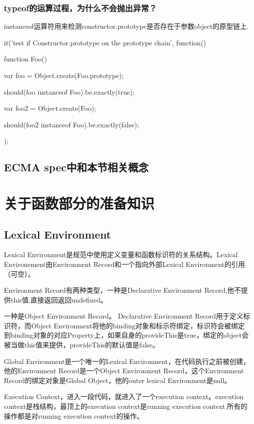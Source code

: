 \subsubsection{typeof的运算过程，为什么不会抛出异常？}

instanceof运算符用来检测constructor.prototype是否存在于参数object的原型链上.
\begin{JavaScript}
		it('test if Constructor.prototype on the prototype chain', function(){
			function Foo(){}

			var foo = Object.create(Foo.prototype);

			should(foo instanceof Foo).be.exactly(true);

			var foo2 = Object.create(Foo);

			should(foo2 instanceof Foo).be.exactly(false);
		});
\end{JavaScript}
	
\subsection{ECMA spec中和本节相关概念}

\section{关于函数部分的准备知识}

\subsection{Lexical Environment}

Lexical Environment是规范中使用定义变量和函数标识符的关系结构。Lexical Environement由Environment Record和一个指向外部Lexical Environment的引用（可空）。

Environment Record有两种类型，一种是Declarative Environment Record,他不提供this值,直接返回返回undefined。

一种是Object Environment Record。 Declarative Environment Record用于定义标识符，而Object Environment将他的binding对象和标示符绑定，标识符会被绑定到binding对象的对应Property上，如果自身的provideThis是true，绑定的object会被当做this值来提供，provideThis的默认值是false。

Global Environment是一个唯一的Lexical Environment，在代码执行之前被创建，他的Environment Record是一个Object Environment Record，这个Environment Record的绑定对象是Global Object，他的outer lexical Environment是null。


Execution Context，进入一段代码，就进入了一个execution context。execution context是栈结构，最顶上的execution context是running execution context.所有的操作都是对running execution context的操作。

